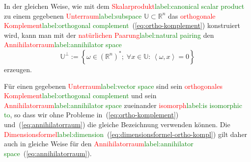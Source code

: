 \documentclass[a4paper,twoside,english,ngerman,deutsch,german,sectrefs,envcountsame,envcountchap]{svmono}
\newcommand{\setref}[2]{\textcolor{red}{#1}\textcolor{green}{#2}}
\begin{document}
In der gleichen Weise, wie mit dem \setref{Skalarprodukt}{label:canonical scalar product} zu einem gegebenen \setref{Unterraum}{label:subspace} $\mathbb{U}\subset{\mathbb{R}}^{n}$ das \setref{orthogonale Komplement}{label:orthogonal complement}~(\ref{eq:ortho-komplement}) konstruiert wird, kann man mit der \setref{natürlichen Paarung}{label:natural pairing} den \setref{Annihilatorraum}{label:annihilator space}
\begin{equation}
\mathbb{U}^{\perp}:=\left\{ \omega\in({\mathbb{R}}^{n})^{*};\;\forall x\in\mathbb{U}:\,\left\langle \omega,x\right\rangle =0\right\} \label{eq:annihilatorraum}
\end{equation}
erzeugen.

Für einen gegebenen \setref{Unterraum}{label:vector space} sind sein \setref{orthogonales Komplement}{label:orthogonal complement} und sein \setref{Annihilatorraum}{label:annihilator space} zueinander \setref{isomorph}{label:is isomorphic to}, so dass wir ohne Probleme in~(\ref{eq:ortho-komplement}) und~(\ref{eq:annihilatorraum}) die gleiche Bezeichnung verwenden können. Die \setref{Dimensionsformel}{label:dimension}~(\ref{eq:dimensionsformel-ortho-kompl}) gilt daher auch in gleiche Weise für den \setref{Annihilatorraum}{label:annihilator space}~(\ref{eq:annihilatorraum}).
\end{document}

